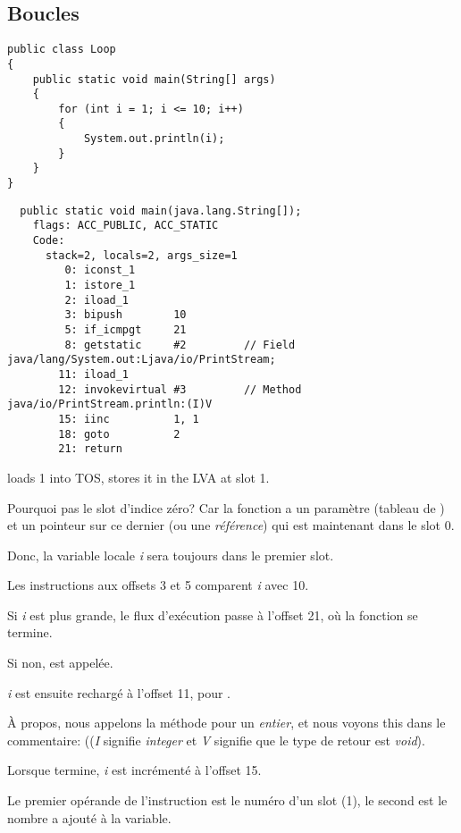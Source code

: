 \subsection{Boucles}

\begin{lstlisting}[style=customjava]
public class Loop
{
	public static void main(String[] args)
	{
		for (int i = 1; i <= 10; i++)
		{
			System.out.println(i);
		}
	}
}
\end{lstlisting}

\begin{lstlisting}
  public static void main(java.lang.String[]);
    flags: ACC_PUBLIC, ACC_STATIC
    Code:
      stack=2, locals=2, args_size=1
         0: iconst_1
         1: istore_1
         2: iload_1
         3: bipush        10
         5: if_icmpgt     21
         8: getstatic     #2         // Field java/lang/System.out:Ljava/io/PrintStream;
        11: iload_1
        12: invokevirtual #3         // Method java/io/PrintStream.println:(I)V
        15: iinc          1, 1
        18: goto          2
        21: return
\end{lstlisting}

 loads 1 into \ac{TOS},  stores it in the \ac{LVA} at slot 1.

Pourquoi pas le slot d'indice zéro?
Car la fonction \main a un paramètre (tableau de ) et un pointeur sur
ce dernier (ou une \emph{référence}) qui est maintenant dans le slot 0.


Donc, la variable locale \emph{i} sera toujours dans le premier slot.


Les instructions aux offsets 3 et 5 comparent \emph{i} avec 10.

Si \emph{i} est plus grande, le flux d'exécution passe à l'offset 21, où la fonction
se termine.

Si non,  est appelée.

\emph{i} est ensuite rechargé à l'offset 11, pour .

À propos, nous appelons la méthode  pour un \emph{entier}, et nous voyons
this dans le commentaire:  ((\emph{I} signifie \emph{integer} et \emph{V}
signifie que le type de retour est \emph{void}).


Lorsque  termine, \emph{i} est incrémenté à l'offset 15.

Le premier opérande de l'instruction est le numéro d'un slot (1), le second est le
nombre a ajouté à la variable.




